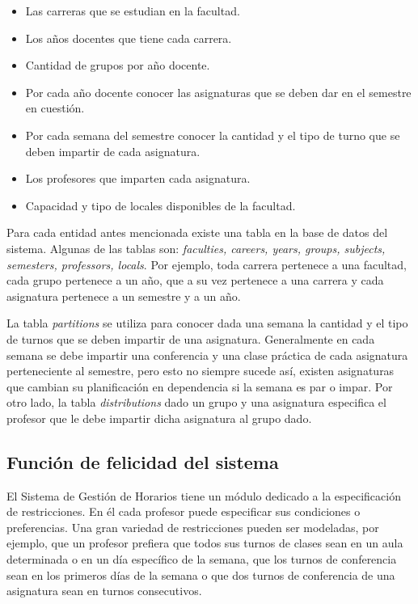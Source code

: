 \begin{itemize}

\item Las carreras que se estudian en la facultad.
\item Los años docentes que tiene cada carrera.
\item Cantidad de grupos por año docente.
\item Por cada año docente conocer las asignaturas que se deben dar en el semestre en cuesti\'on.
\item Por cada semana del semestre conocer la cantidad y el tipo de turno que se deben impartir de cada asignatura.
\item Los profesores que imparten cada asignatura.
\item Capacidad y tipo de locales disponibles de la facultad.

\end{itemize}

Para cada entidad antes mencionada existe una tabla en la base de datos del sistema. Algunas de las tablas son: \emph{faculties, careers, years, groups, subjects, semesters, professors, locals}. Por ejemplo, toda carrera pertenece a una facultad, cada grupo pertenece a un año, que a su vez pertenece a una carrera y cada asignatura pertenece a un semestre y a un año.

La tabla \emph{partitions} se utiliza para conocer dada una semana la cantidad y el tipo de turnos que se deben impartir de una asignatura. Generalmente en cada semana se debe impartir una conferencia y una clase pr\'actica de cada asignatura perteneciente al semestre, pero esto no siempre sucede as\'i, existen asignaturas que cambian su planificaci\'on en dependencia si la semana es par o impar. Por otro lado, la tabla \emph{distributions} dado un grupo y una asignatura especifica el profesor que le debe impartir dicha asignatura al grupo dado.

\subsection{Funci\'on de felicidad del sistema}

El Sistema de Gesti\'on de Horarios tiene un m\'odulo dedicado a la especificaci\'on de restricciones. En \'el cada profesor puede especificar sus condiciones o preferencias. Una gran variedad de restricciones pueden ser modeladas, por ejemplo, que un profesor prefiera que todos sus turnos de clases sean en un aula determinada o en un d\'ia espec\'ifico de la semana, que los turnos de conferencia sean en los primeros d\'ias de la semana o que dos turnos de conferencia de una asignatura sean en turnos consecutivos.

